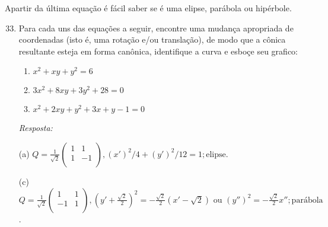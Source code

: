 \documentclass[10pt]{article}
\theoremstyle{plain}
\theoremstyle{obs}
\numberwithin{equation}{section}
\begin{document}
Apartir da última equação é fácil saber se é uma elipse, 
parábola ou hipérbole.
\begin{enumerate}
 \setcounter{enumi}{32}
 \item Para cada uns das equações a seguir, 
 encontre uma mudança apropriada de coordenadas 
 (isto é, uma rotação e/ou translação), 
 de modo que a cônica resultante esteja em forma canônica, 
 identifique a curva e esboçe seu grafico:
     \begin{enumerate}
      \item $x^{2}+xy+y^{2}=6$
      \item $3x^{2}+8xy+3y^{2}+28=0$
      \item $x^{2}+2xy+y^{2}+3x+y-1=0$
     \end{enumerate}
  {\it Resposta:}
  
  (a) $Q=\frac{1}{\sqrt{2}}\begin{pmatrix}
                   1 & 1  \\
                   1 & -1 \\
                   \end{pmatrix}, 
      (x')^2/4+(y')^2/12=1; \text{elipse}$.
       
 (c) $Q=\frac{1}{\sqrt{2}}\begin{pmatrix}
                   1 & 1  \\
                   -1 & 1 \\
                   \end{pmatrix}, 
      (y'+\frac{\sqrt{2}}{2})^{2}=-\frac{\sqrt{2}}{2}(x'-\sqrt{2}) \text{ ou } 
      (y'')^{2}=-\frac{\sqrt{2}}{2}x''; \text{parábola}$. 
  
 \end{enumerate}
 
\end{document}
